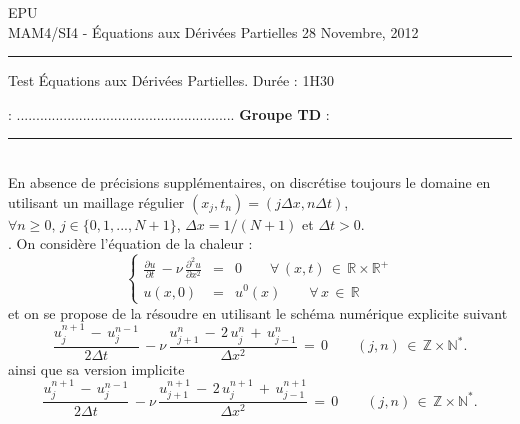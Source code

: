 \documentclass[12pt,a4paper]{article}
\begin{document}
 \hfill EPU\\
\noindent MAM4/SI4 - \'Equations aux D\'eriv\'ees Partielles \hfill 
28 Novembre, 2012 \\

\hrule

\medskip
\centerline {\large \sc Test \'Equations aux D\'eriv\'ees Partielles. Dur\'ee : 1H30}
\vspace{0.5cm}

 :
........................................................ {\bf Groupe TD} : 
\vspace{1cm}

\hrule
\vspace{0.5cm}
\\

\noindent En absence de pr\'ecisions suppl\'ementaires, on discr\'etise
toujours le domaine en utilisant un maillage r\'egulier $(x_j,t_n)=(j\Delta x,n\Delta t)$,  $\forall n\ge 0,\,j\in\{0,1,...,N+1\}$, $\Delta x=1/(N+1)$ et $\Delta t>0$.\\
. On consid\`ere l'\'equation de la chaleur :
\begin{equation} \label{eqn:chaleur}
\left\{
\begin{array}{rcl}
\displaystyle \frac{\partial u}{\partial t} \, - \nu\, \frac{\partial^2 u}{\partial x^2}  & =  & 0  \qquad \forall \, (x,t) \, \in \, \mathbb{R} \times \mathbb{R}^+ \\
\displaystyle u(x,0)  & =  & u^0(x)  \qquad \forall \, x \, \in \, \mathbb{R}
\end{array}
\right.
\end{equation}
et on se propose de la r\'esoudre en utilisant le sch\'ema num\'erique explicite suivant
\begin{equation} \label{eqn:schema1}
\displaystyle  \frac{u_j^{n+1} \, - \, u_j^{n-1}}{2 \Delta t} \, - \nu\,  \frac{u_{j+1}^{n} \,- \,  2 \, u_j^{n} \, + \, u_{j-1}^{n}}{\Delta x ^2 } \,  =  \,   0 \qquad (j,n) \, \in \, \mathbb{Z} \times \mathbb{N}^* .
\end{equation}
ainsi que sa version implicite
\begin{equation} \label{eqn:schema2}
\displaystyle  \frac{u_j^{n+1} \, - \, u_j^{n-1}}{2 \Delta t} \, - \nu\,  \frac{u_{j+1}^{n+1} \,- \,  2 \, u_j^{n+1} \, + \, u_{j-1}^{n+1}}{\Delta x ^2 } \,  =  \,   0 \qquad (j,n) \, \in \, \mathbb{Z} \times \mathbb{N}^* .
\end{equation}
\end{document}

